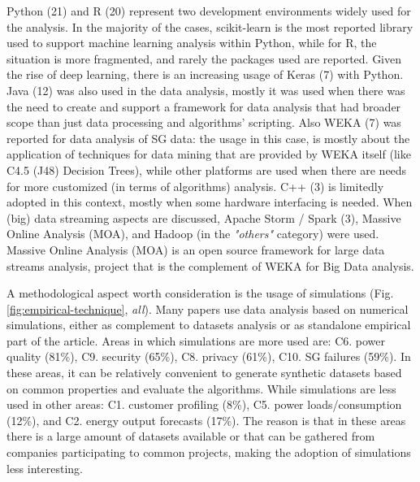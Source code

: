 \documentclass[journal]{IEEEtran}
\begin{document}
Python (21) and R (20) represent two development environments widely used for the analysis. In the majority of the cases, scikit-learn is the most reported library used to support machine learning analysis within Python, while for R, the situation is more fragmented, and rarely the packages used are reported. Given the rise of deep learning, there is an increasing usage of Keras (7) with Python. Java (12) was also used in the data analysis, mostly it was used when there was the need to create and support a framework for data analysis that had broader scope than just data processing and algorithms' scripting. Also WEKA (7) was reported for data analysis of SG data: the usage in this case, is mostly about the application of techniques for data mining that are provided by WEKA itself (like  C4.5 (J48) Decision Trees), while other platforms are used when there are needs for more customized (in terms of algorithms) analysis. C++ (3) is limitedly adopted in this context, mostly when some hardware interfacing is needed. When (big)  data streaming aspects are discussed, Apache Storm / Spark (3), Massive Online Analysis (MOA), and Hadoop (in the \textit{"others"} category) were used. Massive Online Analysis (MOA) is an open source framework for large data streams analysis, project that is the complement of WEKA for Big Data analysis.


A methodological aspect worth consideration is the usage of simulations (Fig. \ref{fig:empirical-technique}, \textit{all}). Many papers use data analysis based on numerical simulations, either as complement to datasets analysis or as standalone empirical part of the article. Areas in which simulations are more used are: C6. power quality (81\%), C9. security (65\%), C8. privacy (61\%), C10. SG failures (59\%). In these areas, it can be relatively convenient to generate synthetic datasets based on common properties and evaluate the algorithms. While simulations are less used in other areas: C1. customer profiling (8\%), C5. power loads/consumption (12\%), and C2. energy output forecasts (17\%). The reason is that in these areas there is a large amount of datasets available or that can be gathered from companies participating to common projects, making the adoption of simulations less interesting.
\end{document}
